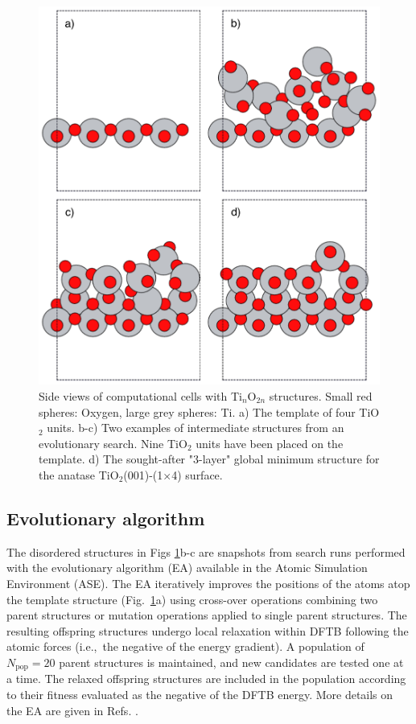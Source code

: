 \documentclass[aip,amsmath,amssymb,reprint]{revtex4-1}
\begin{document}
\begin{figure}[tb]
    \centering
    \includegraphics[width=1.0\columnwidth]{fig1-intro.pdf}
    \caption{Side views of computational cells with Ti$_{n}$O$_{2n}$ structures.
      Small red spheres: Oxygen, large grey spheres: Ti.
      a) The template of four TiO$_2$ units.
      b-c) Two examples of intermediate structures from an evolutionary search. Nine TiO$_2$ units
      have been placed on the template.
      d) The sought-after "3-layer" global minimum structure for the anatase TiO$_2$(001)-(1$\times$4) surface.
    }
    \label{figintro}
\end{figure}

\subsection{Evolutionary algorithm}
The disordered structures in Figs \ref{figintro}b-c are snapshots from
search runs performed with the evolutionary algorithm (EA) available
in the Atomic Simulation Environment (ASE)\cite{ase2}.  The EA
iteratively improves the positions of the atoms atop the template
structure (Fig.\ \ref{figintro}a) using cross-over operations
combining two parent structures or mutation operations applied to
single parent structures. The resulting offspring structures undergo
local relaxation within DFTB following the atomic forces (i.e.,\ the negative of
the energy gradient). A population of $N_\mathrm{pop}=20$ parent structures
is maintained, and new candidates are tested one at a time.
The relaxed offspring structures are included in the population
according to their fitness evaluated as the negative of the DFTB energy.
More details on the EA are given in Refs. \cite{Vilhelmsen2012, Vilhelmsen2014}.
\end{document}
